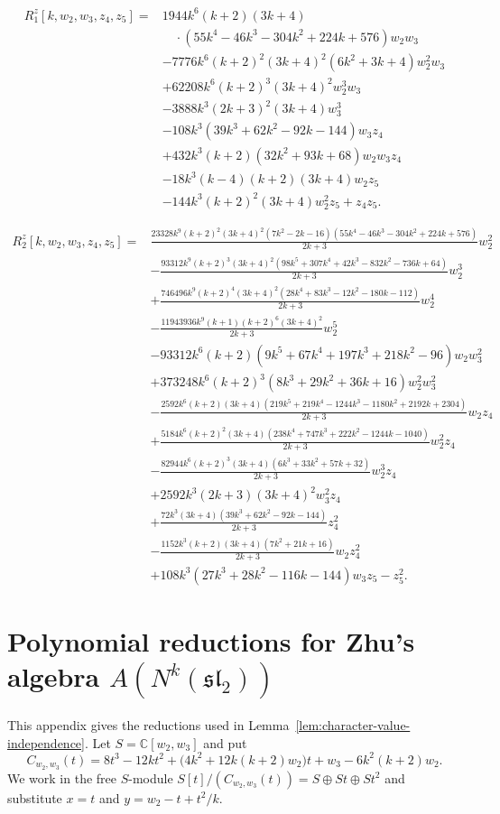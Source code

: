 \documentclass[11 pt]{amsart}
\theoremstyle{definition}
\theoremstyle{plain}
\begin{document}
\begin{align*}
R_1^z[k,w_2,w_3,z_4,z_5]={}&
1944k^6(k+2)(3k+4)\\
&\quad\cdot(55k^4-46k^3-304k^2+224k+576)w_2 w_3\\
&-7776k^6(k+2)^2(3k+4)^2(6k^2+3k+4)w_2^2 w_3\\
&+62208k^6(k+2)^3(3k+4)^2w_2^3 w_3\\
&-3888k^3(2k+3)^2(3k+4)w_3^3\\
&-108k^3(39k^3+62k^2-92k-144)w_3 z_4\\
&+432k^3(k+2)(32k^2+93k+68)w_2 w_3 z_4\\
&-18k^3(k-4)(k+2)(3k+4)w_2 z_5\\
&-144k^3(k+2)^2(3k+4)w_2^2 z_5+z_4 z_5.
\end{align*}

\begin{align*}
R_2^z[k,w_2,w_3,z_4,z_5]={}&
\frac{23328k^9(k+2)^2(3k+4)^2(7k^2-2k-16)
(55k^4-46k^3-304k^2+224k+576)}{2k+3}w_2^2\\
&-\frac{93312k^9(k+2)^3(3k+4)^2
(98k^5+307k^4+42k^3-832k^2-736k+64)}{2k+3}w_2^3\\
&+\frac{746496k^9(k+2)^4(3k+4)^2
(28k^4+83k^3-12k^2-180k-112)}{2k+3}w_2^4\\
&-\frac{11943936k^9(k+1)(k+2)^6(3k+4)^2}{2k+3}w_2^5\\
&-93312k^6(k+2)(9k^5+67k^4+197k^3+218k^2-96)w_2 w_3^2\\
&+373248k^6(k+2)^3(8k^3+29k^2+36k+16)w_2^2 w_3^2\\
&-\frac{2592k^6(k+2)(3k+4)
(219k^5+219k^4-1244k^3-1180k^2+2192k+2304)}{2k+3}w_2 z_4\\
&+\frac{5184k^6(k+2)^2(3k+4)
(238k^4+747k^3+222k^2-1244k-1040)}{2k+3}w_2^2 z_4\\
&-\frac{82944k^6(k+2)^3(3k+4)
(6k^3+33k^2+57k+32)}{2k+3}w_2^3 z_4\\
&+2592k^3(2k+3)(3k+4)^2w_3^2 z_4\\
&+\frac{72k^3(3k+4)(39k^3+62k^2-92k-144)}{2k+3}z_4^2\\
&-\frac{1152k^3(k+2)(3k+4)(7k^2+21k+16)}{2k+3}w_2 z_4^2\\
&+108k^3(27k^3+28k^2-116k-144)w_3 z_5-z_5^2.
\end{align*}


\section{Polynomial reductions for Zhu's algebra
$A(N^k(\mathfrak{sl}_2))$}
\label{app-b}
This appendix gives the reductions used in
Lemma~\ref{lem:character-value-independence}.  Let
$S=\mathbb C[w_2,w_3]$ and put
\[
C_{w_2,w_3}(t)=8t^3-12kt^2+
\bigl(4k^2+12k(k+2)w_2\bigr)t
+w_3-6k^2(k+2)w_2.
\]
We work in the free $S$-module
$S[t]/(C_{w_2,w_3}(t))=S\oplus St\oplus St^2$ and substitute
$x=t$ and $y=w_2-t+t^2/k$.
\end{document}
